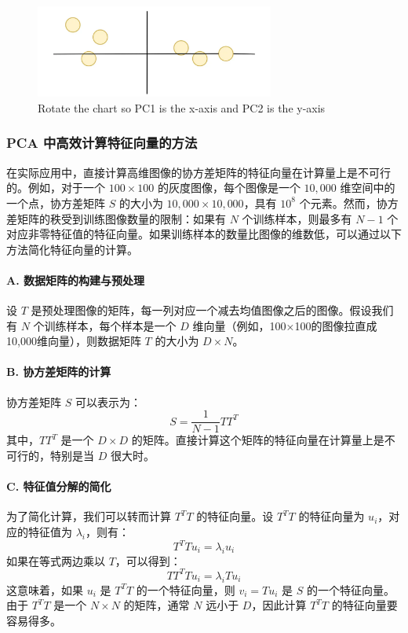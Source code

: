 \documentclass{article}
\begin{document}
\begin{figure}[H]
    \centering
    \includegraphics[width=0.7\textwidth]{Img/1_juLo2GtiuLdHhJOaNljyqw.png}
    \caption{Rotate the chart so PC1 is the x-axis and PC2 is the y-axis}
\end{figure}

\subsubsection{PCA 中高效计算特征向量的方法}
在实际应用中，直接计算高维图像的协方差矩阵的特征向量在计算量上是不可行的。例如，对于一个 $100 \times 100$ 的灰度图像，每个图像是一个 $10,000$ 维空间中的一个点，协方差矩阵 $S$ 的大小为 $10,000 \times 10,000$，具有 $10^8$ 个元素。然而，协方差矩阵的秩受到训练图像数量的限制：如果有 $N$ 个训练样本，则最多有 $N - 1$ 个对应非零特征值的特征向量。如果训练样本的数量比图像的维数低，可以通过以下方法简化特征向量的计算。

\paragraph{A. 数据矩阵的构建与预处理}
设 \( T \) 是预处理图像的矩阵，每一列对应一个减去均值图像之后的图像。假设我们有 \( N \) 个训练样本，每个样本是一个 \( D \) 维向量（例如，100×100的图像拉直成10,000维向量），则数据矩阵 \( T \) 的大小为 \( D \times N \)。

\paragraph{B. 协方差矩阵的计算}
协方差矩阵 \( S \) 可以表示为：
\[
S = \frac{1}{N-1} TT^T
\]
其中，\( TT^T \) 是一个 \( D \times D \) 的矩阵。直接计算这个矩阵的特征向量在计算量上是不可行的，特别是当 \( D \) 很大时。

\paragraph{C. 特征值分解的简化}
为了简化计算，我们可以转而计算 \( T^T T \) 的特征向量。设 \( T^T T \) 的特征向量为 \( u_i \)，对应的特征值为 \( \lambda_i \)，则有：
\[
T^T T u_i = \lambda_i u_i
\]
如果在等式两边乘以 \( T \)，可以得到：
\[
TT^T T u_i = \lambda_i T u_i
\]
这意味着，如果 \( u_i \) 是 \( T^T T \) 的一个特征向量，则 \( v_i = T u_i \) 是 \( S \) 的一个特征向量。由于 \( T^T T \) 是一个 \( N \times N \) 的矩阵，通常 \( N \) 远小于 \( D \)，因此计算 \( T^T T \) 的特征向量要容易得多。
\end{document}
